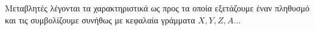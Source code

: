 Μεταβλητές λέγονται τα χαρακτηριστικά ως προς τα οποία εξετάζουμε έναν πληθυσμό και τις συμβολίζουμε συνήθως με κεφαλαία γράμματα $ X,Y,Z,A $...
